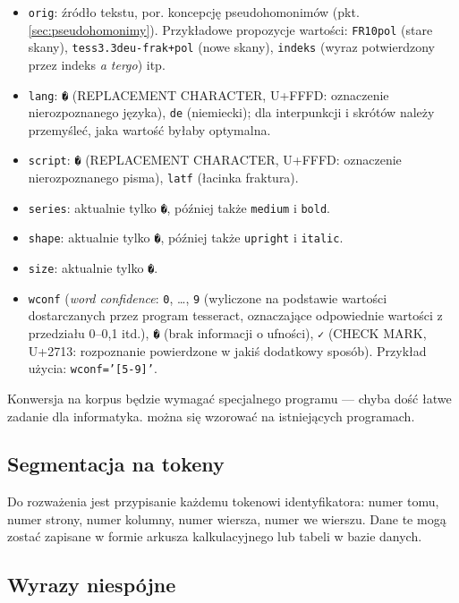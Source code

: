 \documentclass[12]{mwart}
\begin{document}
\begin{itemize}
\item \texttt{orig}: źródło tekstu, por. koncepcję pseudohomonimów
  (pkt. \ref{sec:pseudohomonimy}). Przykładowe propozycje wartości:
  \texttt{FR10pol} (stare skany), \texttt{tess3.3deu-frak+pol} (nowe
  skany), \texttt{indeks} (wyraz potwierdzony przez indeks \textit{a
    tergo}) itp.
\item \texttt{lang}: \texttt{�} (REPLACEMENT CHARACTER, U+FFFD:
  oznaczenie nierozpoznanego języka), \texttt{de} (niemiecki); dla
  interpunkcji i skrótów należy przemyśleć, jaka wartość byłaby optymalna.
\item \texttt{script}: \texttt{�} (REPLACEMENT CHARACTER, U+FFFD:
  oznaczenie nierozpoznanego pisma), \texttt{latf} (łacinka fraktura).
\item \texttt{series}: aktualnie tylko \texttt{�}, później także
  \texttt{medium} i \texttt{bold}.
\item \texttt{shape}: aktualnie tylko \texttt{�}, później także
  \texttt{upright} i \texttt{italic}.
\item \texttt{size}: aktualnie tylko \texttt{�}.
\item \texttt{wconf} (\textit{word confidence}: \texttt{0}, \ldots,
  \texttt{9} (wyliczone na podstawie wartości dostarczanych przez
  program \textsf{tesseract}, oznaczające odpowiednie wartości z
  przedziału 0--0,1 itd.), \texttt{�} (brak informacji o ufności),
  \texttt{✓} (CHECK MARK, U+2713: rozpoznanie powierdzone w jakiś
  dodatkowy sposób). Przykład użycia: \texttt{wconf='[5-9]'}.
\end{itemize}

Konwersja na korpus będzie wymagać specjalnego programu --- chyba dość
łatwe zadanie dla informatyka. można się wzorować na istniejących
programach.

\subsection{Segmentacja na tokeny}
\label{sec:segm-na-tokeny}

Do rozważenia jest przypisanie każdemu tokenowi identyfikatora: numer
tomu, numer strony, numer kolumny, numer wiersza, numer we
wierszu. Dane te mogą zostać zapisane w formie arkusza kalkulacyjnego
lub tabeli w bazie danych.


\subsection{Wyrazy niespójne}
\label{sec:wyrazy-przen-dow}
\end{document}
